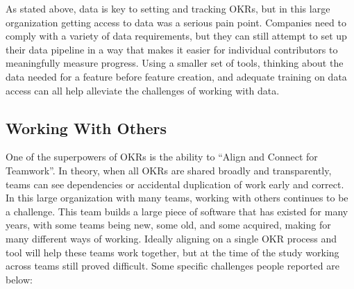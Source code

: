 \documentclass[sigconf, nonacm]{acmart}
\begin{document}



As stated above, data is key to setting and tracking OKRs, but in this large organization getting access to data was a serious pain point. Companies need to comply with a variety of data requirements, but they can still attempt to set up their data pipeline in a way that makes it easier for individual contributors to meaningfully measure progress. Using a smaller set of tools, thinking about the data needed for a feature before feature creation, and adequate training on data access can all help alleviate the challenges of working with data.

\subsection{Working With Others}

One of the superpowers of OKRs is the ability to ``Align and Connect for Teamwork''. In theory, when all OKRs are shared broadly and transparently, teams can see dependencies or accidental duplication of work early and correct. In this large organization with many teams, working with others continues to be a challenge. This team builds a large piece of software that has existed for many years, with some teams being new, some old, and some acquired, making for many different ways of working. Ideally aligning on a single OKR process and tool will help these teams work together, but at the time of the study working across teams still proved difficult. Some specific challenges people reported are below: 

\end{document}
